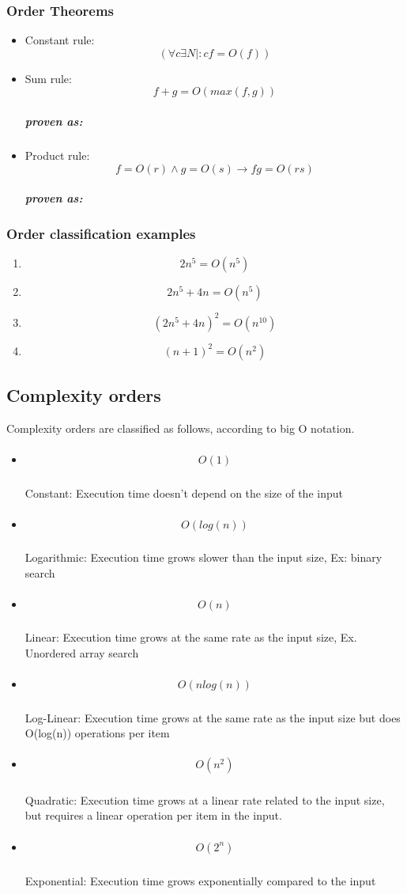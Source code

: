 \documentclass[12pt,a4paper,olive]{bbe}
\begin{document}
	\subsubsection{Order Theorems}
	\begin{itemize}
		\item Constant rule: $$(\forall c  \exists  N | : cf = O(f))$$
		\item {
			Sum rule: $$ f + g = O(max(f,g)) $$
			\subparagraph*{proven as:}
			
			}
		\item {
			Product rule: $$ f = O(r) \land g = O(s) \longrightarrow fg = O(rs) $$
			\subparagraph*{proven as:}
			
			}
	\end{itemize}

	\subsubsection{Order classification examples}
	\begin{enumerate}
		\item $$2n^5 = O(n^5)$$
		\item $$2n^5 + 4n = O(n^5) $$
		\item $$ (2n^5 + 4n)^2 = O(n^{10})$$
		\item $$(n+1)^2 = O(n^2)$$
	\end{enumerate}

	\subsection{Complexity orders}
	Complexity orders are classified as follows, according to big O notation.
	\begin{itemize}
		\item {
			\subparagraph*{$$O(1)$$} 
		Constant: Execution time doesn't depend on the size of the input
		} 
		\item {
			\subparagraph{$$O(log(n))$$}
		Logarithmic: Execution time grows slower than the input size, Ex: binary search
		}
		\item {
			\subparagraph{$$O(n)$$}
		Linear: Execution time grows at the same rate as the input size, Ex. Unordered array search 
		}
		\item {
			\subparagraph{$$O(n log(n))$$}
		Log-Linear: Execution time grows at the same rate as the input size but does O(log(n)) operations per item
		}
		\item {
			\subparagraph{$$O(n^2)$$}
		Quadratic: Execution time grows at a linear rate related to the input size, but requires a linear operation per item in the input.
		}
		\item {
			\subparagraph{$$O(2^n)$$}
		Exponential: Execution time grows exponentially compared to the input
		}
	\end{itemize}

	\


	
 
\end{document}
